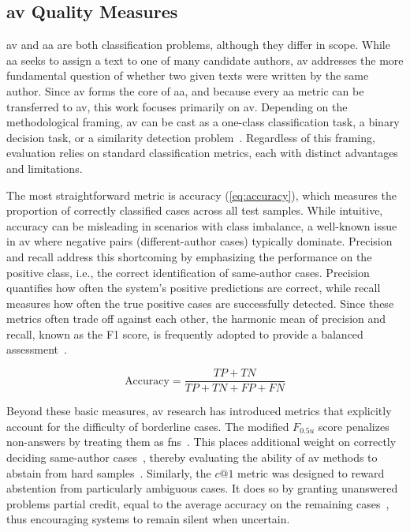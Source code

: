 \subsection{\ac{av} Quality Measures}
\label{subsec:av_quality_measures}

\ac{av} and \ac{aa} are both classification problems, although they differ in scope. 
While \ac{aa} seeks to assign a text to one of many candidate authors, \ac{av} addresses the more fundamental question of whether two given texts were written by the same author. 
Since \ac{av} forms the core of \ac{aa}, and because every \ac{aa} metric can be transferred to \ac{av}, this work focuses primarily on \ac{av}. 
Depending on the methodological framing, \ac{av} can be cast as a one-class classification task, a binary decision task, or a similarity detection problem~\citep{neal_surveying_2018,koppel_authorship_2004}. 
Regardless of this framing, evaluation relies on standard classification metrics, each with distinct advantages and limitations.

The most straightforward metric is accuracy (\autoref{eq:accuracy}), which measures the proportion of correctly classified cases across all test samples. 
While intuitive, accuracy can be misleading in scenarios with class imbalance, a well-known issue in \ac{av} where negative pairs (different-author cases) typically dominate. 
Precision and recall address this shortcoming by emphasizing the performance on the positive class, i.e., the correct identification of same-author cases. 
Precision quantifies how often the system’s positive predictions are correct, while recall measures how often the true positive cases are successfully detected. 
Since these metrics often trade off against each other, the harmonic mean of precision and recall, known as the F1 score, is frequently adopted to provide a balanced assessment~\citep{neal_surveying_2018}.

\begin{equation}\label{eq:accuracy}
    \text{Accuracy} = \frac{TP + TN}{TP + TN + FP + FN}
\end{equation}


Beyond these basic measures, \ac{av} research has introduced metrics that explicitly account for the difficulty of borderline cases. 
The modified $F_{0.5u}$ score penalizes non-answers by treating them as \acp{fn}~\citep{bevendorff_overview_2024}. 
This places additional weight on correctly deciding same-author cases~\citep{weerasinghe_feature_vector_difference_2021}, thereby evaluating the ability of \ac{av} methods to abstain from hard samples~\citep{tyo_state_2022}. 
Similarly, the $c@1$ metric was designed to reward abstention from particularly ambiguous cases. 
It does so by granting unanswered problems partial credit, equal to the average accuracy on the remaining cases~\citep{bevendorff_overview_2024}, thus encouraging systems to remain silent when uncertain.

